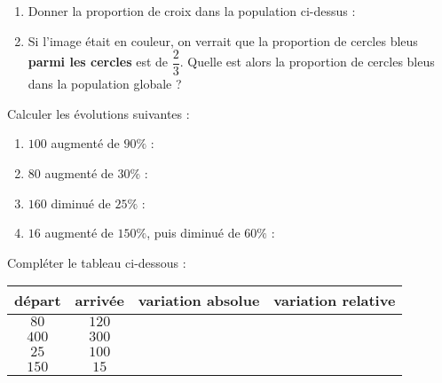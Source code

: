 \documentclass[
	classe=$2^{de}$,
	landscape,
	twocolumn,
	headerTitle={Interrogation 15 min.}
]{évaluation}
\begin{document}
\begin{exercice}
	\begin{center}
	\end{center}

	\begin{enumerate}
		\item Donner la proportion de croix dans la population ci-dessus : 
		\item Si l'image était en couleur, on verrait que la proportion de cercles bleus \textbf{parmi les cercles} est de $\dfrac{2}{3}$. Quelle est alors la proportion de cercles bleus dans la population globale ? 
	\end{enumerate}
\end{exercice}

\begin{exercice}
	Calculer les évolutions suivantes :
	\begin{enumerate}
		\item $100$ augmenté de $90\%$ : 
		\item $80$ augmenté de $30\%$ : 
		\item $160$ diminué de $25\%$ : 
		\item $16$ augmenté de $150\%$, puis diminué de $60\%$ : 
	\end{enumerate}
\end{exercice}

\begin{exercice}
	Compléter le tableau ci-dessous :
	\begin{center}
		\begin{tabular}{|c|c|c|c|}
			\hline
			départ & arrivée & variation absolue   & variation relative   \\ \hline
			$80$   & $120$   & \correction{$40$}   & \correction{$0,5$}   \\ \hline
			$400$  & $300$   & \correction{$-100$} & \correction{$-0,25$} \\ \hline
			$25$   & $100$   & \correction{$75$}   & \correction{$3$}     \\ \hline
			$150$  & $15$    & \correction{$-135$} & \correction{$-0,9$}  \\ \hline
		\end{tabular}
	\end{center}
\end{exercice}
\end{document}
